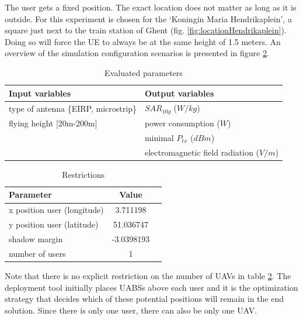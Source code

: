The user gets a fixed position. The exact location does not matter as long as it is outside. For this experiment is chosen for the 
`Koningin Maria Hendrikaplein', a square just next to the train station of Ghent (fig. \ref{fig:locationHendrikaplein}).  Doing so will force the \gls{UE} 
to always be at the same height of 1.5 meters. 
An overview of the simulation configuration scenarios is presented in figure \ref{table:S1:restrictions}.
\newline
\begin{table}[!htb]
\centering
            \begin{tabular}{|l|l|}
            \hline
            \textbf{Input variables  }                    & \textbf{Output variables}          \\   \hline 
            type of antenna \{EIRP, microstrip\}            & $SAR_{10g}$  ($W/kg$)            \\ 
            flying height [20m-200m]                        & power consumption  ($W$)           \\ 
                                                          &  minimal $P_{tx}$ ($dBm$)\\ 
                                                          & electromagnetic field radiation ($V/m$)\\
            \hline
            \end{tabular} 
            \caption{Evaluated parameters}
          \label{table:s1:evalpara}
\end{table}
\begin{table}[!htb]
\centering
        \begin{tabular}{|l|c|l|}
        \hline
        \textbf{Parameter}              & \textbf{Value}          \\   \hline 
        x position user (longitude)              & 3.711198       \\    
        y position user (latitude)               & 51.036747          \\ 
        shadow margin             & -3.0398193 \\
        number of users                & 1 \\
        \hline
        \end{tabular}
        \caption{Restrictions}
        \label{table:S1:restrictions}
\end{table}


Note that there is no explicit restriction on the number of \gls{UAV}s in table \ref{table:S1:restrictions}. The deployment tool initially places 
\gls{UABS}s above each user and it is the optimization strategy that decides which of these potential positions will remain in the end solution.
Since there is only one user, there can also be only one \gls{UAV}.

